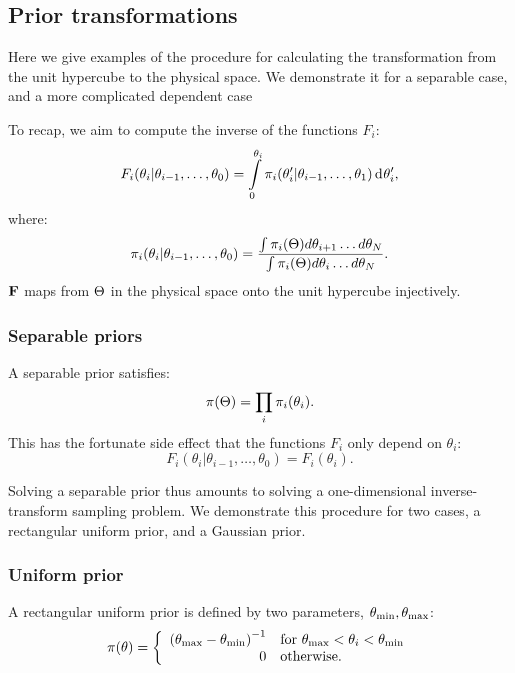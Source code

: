 \subsection{Prior transformations}
\label{sec:pc:prior_transformations}
Here we give examples of the procedure for calculating the transformation from the unit hypercube to the physical space. We demonstrate it for a separable case, and a more complicated dependent case

To recap, we aim to compute the inverse of the functions \(F_i\): 
\begin{equation}
  F_i(\theta_i|\theta_{i-1},\ldots,\theta_0) = \int\limits_0^{\theta_i} \pi_i(\theta_i^\prime|\theta_{i-1},\ldots,\theta_1) \operatorname{d}^{}\!{\theta_i^\prime},
  \label{eqn:pc:appFi}
\end{equation}
%
where:
%
\begin{equation}
  \pi_i(\theta_i|\theta_{i-1},\ldots,\theta_0) 
  =
  \frac{%
    \int \pi_i(\params) d\theta_{i+1}\ldots d\theta_{N}
  }{%
    \int \pi_i(\params) d\theta_{i}\ldots d\theta_{N}
  }.
  \label{eqn:pc:apppii}
\end{equation}
\(\mathbf{F}\) maps from \(\Theta\) in the physical space onto the unit hypercube injectively. 



\subsubsection{Separable priors}
\label{sec:pc:separable_priors}
A separable prior satisfies:
\begin{equation}
  \pi(\Theta) = \prod_i\pi_i(\theta_i).
  \label{eqn:pc:separability}
\end{equation}
This has the fortunate side effect that the functions \(F_i\) only depend on \(\theta_i\):
\begin{equation}
  F_i(\theta_i|\theta_{i-1},\ldots,\theta_0) = F_i(\theta_i).
\end{equation}

Solving a separable prior thus amounts to solving a one-dimensional inverse-transform sampling problem. We demonstrate this procedure for two cases, a rectangular uniform prior, and a Gaussian prior.

\subsubsection{Uniform prior}
\label{sec:pc:uniform_prior}
\newcommand{\thetamin}{\theta_\smin} %
\newcommand{\thetamax}{\theta_\smax} %
A rectangular uniform prior is defined by two parameters, \({\thetamin,\thetamax}\):
\begin{equation}
  \pi(\theta) = 
  \left\{
    \begin{array}{rl}
      {(\thetamax - \thetamin)}^{-1} 
      &
      \text{for }\thetamax<\theta_i<\thetamin \\
      0 & \text{otherwise.}
    \end{array}
  \right.
\label{eqn:pc:uniform_prior}
\end{equation}

